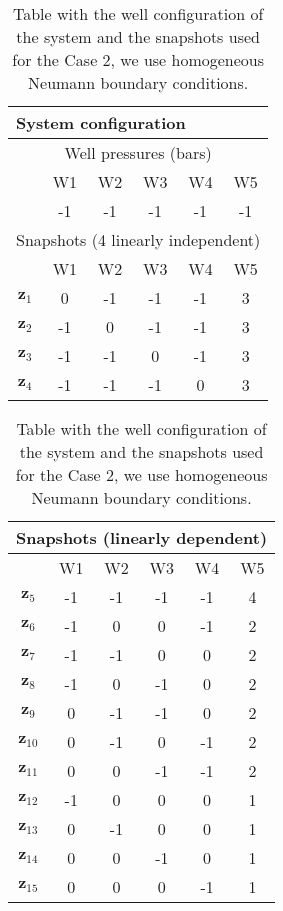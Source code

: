 \documentclass[12pt]{article}
\numberwithin{equation}{section}
\begin{document}
\begin{table}[!ht]\centering
\begin{minipage}{.45\textwidth}
\vspace{-10pt}
\centering
\begin{tabular}{ |c|c|c|c|c|c|} 
 \hline
  \multicolumn{6}{|l|}{System configuration} \\ 
  \hline
  \multicolumn{6}{|c|}{Well pressures (bars)}\\
  \hline
  &W1 &W2 &W3 &W4 &W5 \\
  \hline
&-1 & -1& -1& -1& -1\\
\hline
\multicolumn{6}{|l|}{Snapshots (4 linearly independent)} \\
\hline
 &W1 &W2 &W3 &W4 &W5 \\
  \hline

$\mathbf{z}_1$& 0&-1 &-1 &-1 &3 \\
$\mathbf{z}_2$& -1&0 &-1 &-1 &3  \\
$\mathbf{z}_3$& -1&-1 &0 &-1 &3  \\
$\mathbf{z}_4$& -1&-1 &-1 &0 &3  \\
 \hline
 \end{tabular}
\label{table:case2}\end{minipage}%
\hspace{10pt}
 \begin{minipage}{.45\textwidth}
 \begin{tabular}{ |c|c|c|c|c|c|} 
 \hline
 \multicolumn{6}{|l|}{Snapshots (linearly dependent)} \\
\hline
 &W1 &W2 &W3 &W4 &W5 \\
  \hline
$\mathbf{z}_5$& -1&-1 &-1 &-1 &4  \\
$\mathbf{z}_6$& -1&0 &0 &-1 &2  \\
$\mathbf{z}_7$& -1&-1 &0 &0 &2  \\
$\mathbf{z}_8$& -1&0 &-1 &0 &2  \\
$\mathbf{z}_9$& 0&-1 &-1 &0 &2  \\
$\mathbf{z}_{10}$& 0&-1 &0 &-1 &2  \\
$\mathbf{z}_{11}$& 0&0 &-1 &-1 &2  \\
$\mathbf{z}_{12}$& -1&0 &0 &0 &1  \\
$\mathbf{z}_{13}$& 0&-1 &0 &0 &1  \\
$\mathbf{z}_{14}$& 0&0 &-1 &0 &1  \\
$\mathbf{z}_{15}$& 0&0 &0 &-1 &1  \\
 \hline
 \end{tabular}

\label{table:case2}\end{minipage}\caption{Table with the well configuration of the system and the snapshots used for the Case 2, we use homogeneous Neumann boundary conditions.}
\vspace{-10pt}
\end{table}
\end{document}
